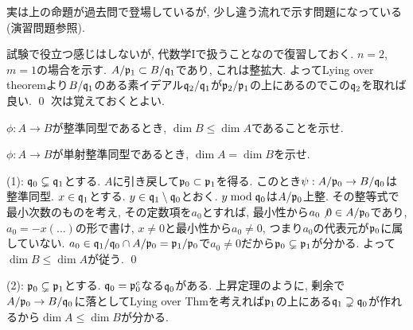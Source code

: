 実は上の命題が過去問で登場しているが, 少し違う流れで示す問題になっている(演習問題参照). \par
試験で役立つ感じはしないが, 代数学Iで扱うことなので復習しておく.
\prf $n=2$, $m=1$の場合を示す. $A/\mathfrak{p}_{1} \subset B/\mathfrak{q}_{1}$であり, これは整拡大. よってLying over theoremより$B/\mathfrak{q}_{1}$のある素イデアル$\mathfrak{q}_2/\mathfrak{q}_1$が$\mathfrak{p}_{2}/\mathfrak{p}_1$の上にあるのでこの$\mathfrak{q}_{2}$を取れば良い. \qed
次は覚えておくとよい.
\begin{egprob} \label{egprob:dimA_dimB_integral_ext}
\ben
\item $\phi:A\to B$が整準同型であるとき, $\dim{B}\leq \dim{A}$であることを示せ.
\item $\phi:A\to B$が単射整準同型であるとき, $\dim{A} = \dim{B}$を示せ.
\een
\end{egprob}
\begin{egans}
(1): $\mathfrak{q}_0\subsetneq \mathfrak{q}_1$とする. $A$に引き戻して$\mathfrak{p}_0 \subset \mathfrak{p}_1$を得る. このとき$\psi:A/\mathfrak{p}_0\to B/\mathfrak{q}_0$は整準同型. $x\in \mathfrak{q}_1$とする. $y\in \mathfrak{q}_1\setminus{\mathfrak{q}_0}$とおく. $y\bmod{\mathfrak{q}_0}$は$A/\mathfrak{p}_0$上整. その整等式で最小次数のものを考え, その定数項を$a_0$とすれば,  最小性から$a_0 \not 0 \in A/\mathfrak{p}_0$であり, $a_0 = -x (\dots)$の形で書け, $x\neq 0$と最小性から$a_0\neq 0$, つまり$a_0$の代表元が$\mathfrak{p}_0$に属していない.  $a_0\in \mathfrak{q}_1/\mathfrak{q}_0 \cap A/\mathfrak{p}_0 = \mathfrak{p}_1/\mathfrak{p}_0$で$a_0\neq 0$だから$\mathfrak{p}_0\subsetneq \mathfrak{p}_1$が分かる. よって$\dim{B} \leq \dim{A}$が従う. \qed

(2): $\mathfrak{p}_0\subsetneq \mathfrak{p}_1$とする. $\mathfrak{q}_0  =  \mathfrak{p}_0^{c}$なる$\mathfrak{q}_0$がある. 上昇定理のように, 剰余で$A/\mathfrak{p}_0 \to B/\mathfrak{q}_0$に落としてLying over Thmを考えれば$\mathfrak{p}_1$の上にある$\mathfrak{q}_1\supsetneq \mathfrak{q}_0$が作れるから$\dim{A}\leq \dim{B}$が分かる.
\end{egans}





